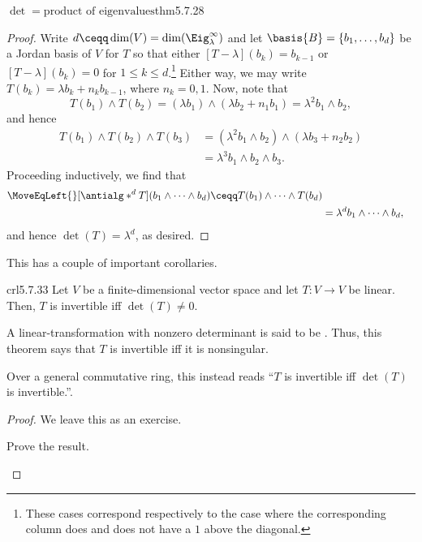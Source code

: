 \begin{thm}{$\det =\text{product of eigenvalues}$}{thm5.7.28}
\begin{proof}
		Write $d\ceqq \dim (V)=\dim (\Eig _{\lambda}^{\infty})$ and let $\basis{B}=\{ b_1,\ldots ,b_d\}$ be a Jordan basis of $V$ for $T$ so that either $[T-\lambda ](b_k)=b_{k-1}$ or $[T-\lambda ](b_k)=0$ for $1\leq k\leq d$.\footnote{These cases correspond respectively to the case where the corresponding column does and does not have a $1$ above the diagonal.}  Either way, we may write $T(b_k)=\lambda b_k+n_kb_{k-1}$, where $n_k=0,1$.  Now, note that
		\begin{equation}
			T(b_1)\wedge T(b_2)=(\lambda b_1)\wedge (\lambda b_2+n_1b_1)=\lambda ^2b_1\wedge b_2,
		\end{equation}
		and hence
		\begin{equation}
			\begin{split}
				T(b_1)\wedge T(b_2)\wedge T(b_3) & =(\lambda ^2b_1\wedge b_2)\wedge (\lambda b_3+n_2b_2) \\
				& =\lambda ^3b_1\wedge b_2\wedge b_3.
			\end{split}
		\end{equation}
		Proceeding inductively, we find that
		\begin{equation}
			\begin{split}
				\MoveEqLeft {}
				[\antialg* ^dT](b_1\wedge \cdots \wedge b_d)\ceqq T(b_1)\wedge \cdots \wedge T(b_d) \\
				& =\lambda ^db_1\wedge \cdots \wedge b_d,
			\end{split}
		\end{equation}
		and hence $\det (T)=\lambda ^d$, as desired.
	\end{proof}
\end{thm}
This has a couple of important corollaries.
\begin{crl}{}{crl5.7.33}
	Let $V$ be a finite-dimensional vector space and let $T\colon V\rightarrow V$ be linear.  Then, $T$ is invertible iff $\det (T)\neq 0$.
	\begin{rmk}
		A linear-transformation with nonzero determinant is said to be .  Thus, this theorem says that $T$ is invertible iff it is nonsingular.
	\end{rmk}
	\begin{rmk}
		Over a general commutative ring, this instead reads ``$T$ is invertible iff $\det (T)$ is invertible.''.
	\end{rmk}
	\begin{proof}
		We leave this as an exercise.
		\begin{exr}[breakable=false]{}{}
			Prove the result.
		\end{exr}
	\end{proof}
\end{crl}
